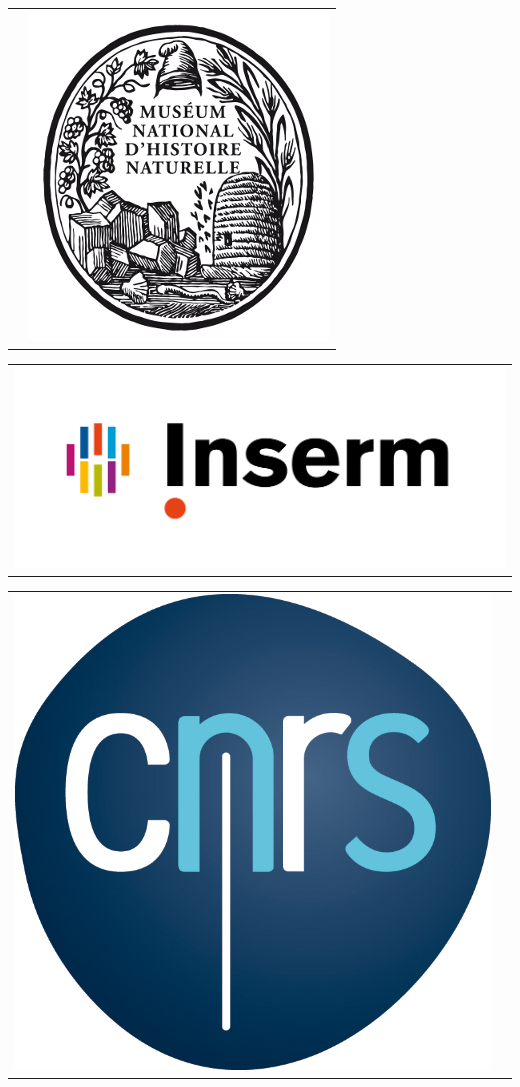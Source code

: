 \documentclass[12pt,a4paper]{article}
\begin{document}
\begin{titlepage}
\begin{sffamily}
\begin{center}
\begin{tabular}{cc}
 \hspace*{3cm} &  
\includegraphics[scale=0.2]{img/mnhn.jpg}
\end{tabular}
\hfill
\begin{tabular}{c}
\includegraphics[scale=0.08]{img/inserm.jpg}
\end{tabular}
\hfill
\begin{tabular}{cc}
\includegraphics[scale=0.08]{img/cnrs.png} &
\hspace*{3cm}
\end{tabular}


\end{center}
\end{sffamily}
\end{titlepage}
\end{document}
